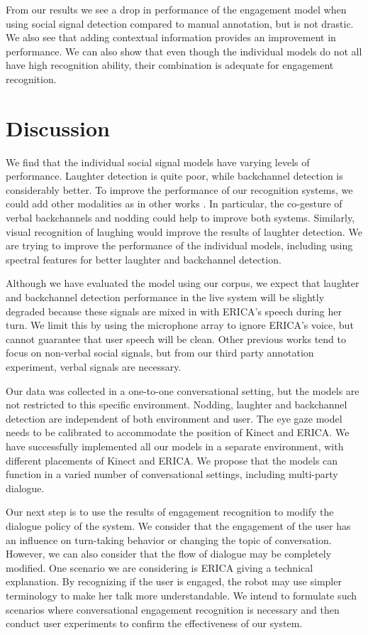 \documentclass[letterpaper]{article} %
\begin{document}
\vspace{-2.21mm}
From our results we see a drop in performance of the engagement model when using social signal detection compared to manual annotation, but is not drastic. We also see that adding contextual information provides an improvement in performance. We can also show that even though the individual models do not all have high recognition ability, their combination is adequate for engagement recognition.

\vspace{-0.89mm}
\vspace{-2.26mm}
\section{Discussion}
We find that the individual social signal models have varying levels of performance. Laughter detection is quite poor, while backchannel detection is considerably better. To improve the performance of our recognition systems, we could add other modalities as in other works \cite{Morency2005}. In particular, the co-gesture of verbal backchannels and nodding could help to improve both systems. Similarly, visual recognition of laughing would improve the results of laughter detection. We are trying to improve the performance of the individual models, including using spectral features for better laughter and backchannel detection.

Although we have evaluated the model using our corpus, we expect that laughter and backchannel detection performance in the live system will be slightly degraded because these signals are mixed in with ERICA's speech during her turn. We limit this by using the microphone array to ignore ERICA's voice, but cannot guarantee that user speech will be clean. Other previous works tend to focus on non-verbal social signals, but from our third party annotation experiment, verbal signals are necessary.

Our data was collected in a one-to-one conversational setting, but the models are not restricted to this specific environment. Nodding, laughter and backchannel detection are independent of both environment and user. The eye gaze model needs to be calibrated to accommodate the position of Kinect and ERICA. We have successfully implemented all our models in a separate environment, with different placements of Kinect and ERICA. We propose that the models can function in a varied number of conversational settings, including multi-party dialogue.

Our next step is to use the results of engagement recognition to modify the dialogue policy of the system. We consider that the engagement of the user has an influence on turn-taking behavior or changing the topic of conversation. However, we can also consider that the flow of dialogue may be completely modified. One scenario we are considering is ERICA giving a technical explanation. By recognizing if the user is engaged, the robot may use simpler terminology to make her talk more understandable. We intend to formulate such scenarios where conversational engagement recognition is necessary and then conduct user experiments to confirm the effectiveness of our system.
\end{document}
